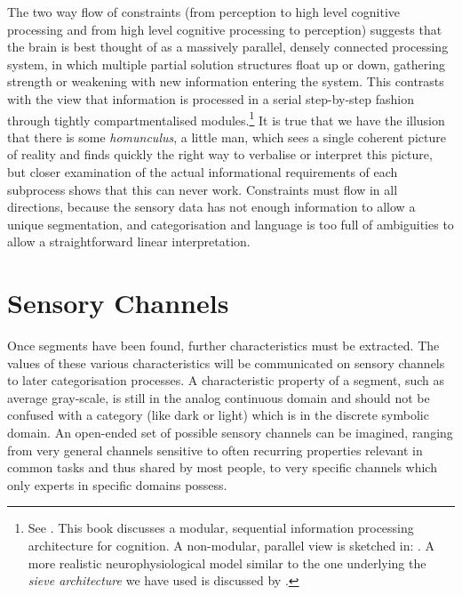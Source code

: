 The two way flow of constraints (from perception to 
high level cognitive processing and from high level 
cognitive processing to perception) suggests 
that the brain is best thought of as a massively parallel, 
densely connected processing system, in which multiple 
partial solution structures float up or down, gathering strength 
or weakening with new information entering the system. 
This contrasts with the view that 
information is processed in a serial step-by-step fashion
through tightly compartmentalised modules.\footnote{
See \cite{Fodor:1983}. This book discusses a modular, sequential 
information processing architecture for cognition. A 
non-modular, parallel view 
is sketched in: \cite{Minsky:1985}. 
A more realistic neurophysiological model similar to the 
one underlying the {\it sieve architecture} we have used is
discussed by \cite{Edelman:1987}.} It is true
that we have the illusion that there 
is some {\itshape homunculus}, a little man, which sees a single coherent 
picture of reality and finds quickly the right way to 
verbalise or interpret this picture, but closer examination 
of the actual informational requirements of each subprocess
shows that this can never work. Constraints must flow in all 
directions, because the sensory data has not enough information to allow 
a unique segmentation, and categorisation and language is 
too full of ambiguities to allow a straightforward linear
interpretation. 

\section{Sensory Channels}

Once segments have been found, further characteristics must
be extracted. The values of these various characteristics
will be communicated on sensory channels to later categorisation
processes. A characteristic property of a segment, such as 
average gray-scale, is still in the
analog continuous domain and should not be confused with
a category (like dark or light) which is in the
discrete symbolic domain. An open-ended set of possible sensory 
channels can be imagined, ranging from very general 
channels sensitive to often recurring properties relevant
in common tasks and thus shared by most people, to very 
specific channels which only experts in specific
domains possess. 

